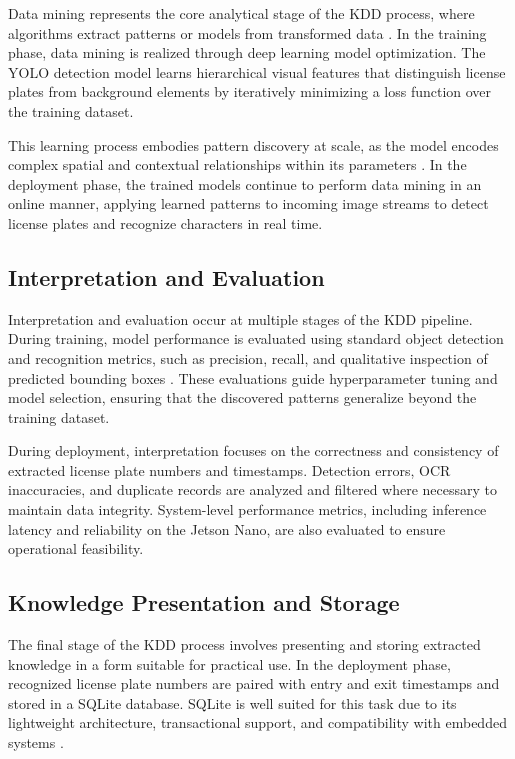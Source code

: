 Data mining represents the core analytical stage of the KDD process, where algorithms extract patterns or models from transformed data \cite{han2011data}. In the training phase, data mining is realized through deep learning model optimization. The YOLO detection model learns hierarchical visual features that distinguish license plates from background elements by iteratively minimizing a loss function over the training dataset.

This learning process embodies pattern discovery at scale, as the model encodes complex spatial and contextual relationships within its parameters \cite{lecun2015deep}. In the deployment phase, the trained models continue to perform data mining in an online manner, applying learned patterns to incoming image streams to detect license plates and recognize characters in real time.

\subsection{Interpretation and Evaluation}

Interpretation and evaluation occur at multiple stages of the KDD pipeline. During training, model performance is evaluated using standard object detection and recognition metrics, such as precision, recall, and qualitative inspection of predicted bounding boxes \cite{everingham2010pascal}. These evaluations guide hyperparameter tuning and model selection, ensuring that the discovered patterns generalize beyond the training dataset.

During deployment, interpretation focuses on the correctness and consistency of extracted license plate numbers and timestamps. Detection errors, OCR inaccuracies, and duplicate records are analyzed and filtered where necessary to maintain data integrity. System-level performance metrics, including inference latency and reliability on the Jetson Nano, are also evaluated to ensure operational feasibility.

\subsection{Knowledge Presentation and Storage}

The final stage of the KDD process involves presenting and storing extracted knowledge in a form suitable for practical use. In the deployment phase, recognized license plate numbers are paired with entry and exit timestamps and stored in a SQLite database. SQLite is well suited for this task due to its lightweight architecture, transactional support, and compatibility with embedded systems \cite{sqlite_doc}.

